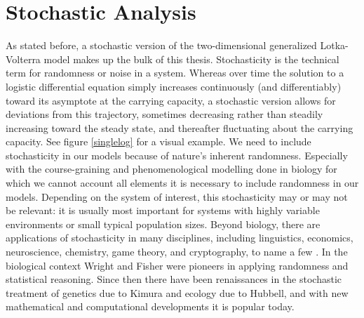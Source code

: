 \section{Stochastic Analysis}
As stated before, a stochastic version of the two-dimensional generalized Lotka-Volterra model makes up the bulk of this thesis. 
Stochasticity is the technical term for randomness or noise in a system. %
Whereas over time the solution to a logistic differential equation simply increases continuously (and differentiably) toward its asymptote at the carrying capacity, a stochastic version allows for deviations from this trajectory, sometimes decreasing rather than steadily increasing toward the steady state, and thereafter fluctuating about the carrying capacity. 
See figure \ref{singlelog} for a visual example. 
We need to include stochasticity in our models because of nature's inherent randomness. 
Especially with the course-graining and phenomenological modelling done in biology for which we cannot account all elements it is necessary to include randomness in our models. 
Depending on the system of interest, this stochasticity may or may not be relevant: it is usually most important for systems with highly variable environments or small typical population sizes. 
Beyond biology, there are applications of stochasticity in many disciplines, including linguistics, economics, neuroscience, chemistry, game theory, and cryptography, to name a few \cite{Schuster1983,BrianArthur1987,Borgers1997,Hofbauer2003,Pemantle2007,Blythe2007,Hilbe2011,Yan2013}. %
In the biological context Wright and Fisher were pioneers in applying randomness and statistical reasoning. %
Since then there have been renaissances in the stochastic treatment of genetics due to Kimura and ecology due to Hubbell, and with new mathematical and computational developments it is popular today. %

